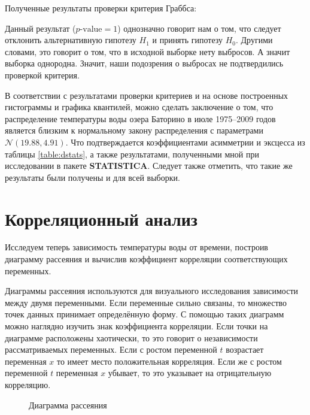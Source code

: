 Полученные результаты проверки критерия Граббса:

Данный результат ($p\textrm{-value} = 1$) однозначно говорит нам о том, что следует отклонить альтернативную гипотезу $H_{1}$ и принять гипотезу $H_{0}$. Другими словами, это говорит о том, что в исходной выборке нету выбросов. А значит выборка однородна. Значит, наши подозрения о выбросах не подтвердились проверкой критерия.

В соответствии с результатами проверки критериев и на основе построенных гистограммы и графика квантилей, можно сделать заключение о том, что распределение температуры воды озера Баторино в июле 1975--2009 годов является близким к нормальному закону распределения с параметрами $\mathcal{N}(19.88, 4.91)$. Что подтверждается коэффициентами асимметрии и эксцесса из таблицы \ref{table:dstats}, а также результатами, полученными мной при исследовании в пакете \textbf{STATISTICA}. Следует также отметить, что такие же результаты были получены и для всей выборки.


\section{Корреляционный анализ} %
\label{sec:corr_analysis}

Исследуем теперь зависимость температуры воды от времени, построив диаграмму рассеяния и вычислив коэффициент корреляции соответствующих переменных.

Диаграммы рассеяния используются для визуального исследования зависимости между двумя переменными. Если переменные сильно связаны, то множество точек данных принимает определённую форму. С помощью таких диаграмм можно наглядно изучить знак коэффициента корреляции. Если точки на диаграмме расположены хаотически, то это говорит о независимости рассматриваемых переменных. Если с ростом переменной $t$ возрастает переменная $x$ то имеет место положительная корреляция. Если же с ростом переменной $t$ переменная $x$ убывает, то это указывает на отрицательную корреляцию. 
\begin{figure}[ht]
\caption{Диаграмма рассеяния}
\label{img:scatterplot}
\end{figure}

